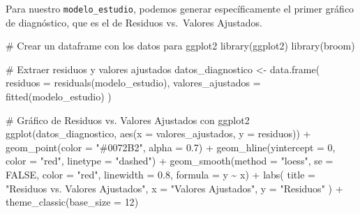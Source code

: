 \documentclass[
  letterpaper,
  DIV=11,
  numbers=noendperiod]{scrreprt}
\newenvironment{Shaded}{\begin{snugshade}}{\end{snugshade}}
\newcommand{\AttributeTok}[1]{\textcolor[rgb]{0.40,0.45,0.13}{#1}}
\newcommand{\CommentTok}[1]{\textcolor[rgb]{0.37,0.37,0.37}{#1}}
\newcommand{\ConstantTok}[1]{\textcolor[rgb]{0.56,0.35,0.01}{#1}}
\newcommand{\DecValTok}[1]{\textcolor[rgb]{0.68,0.00,0.00}{#1}}
\newcommand{\FloatTok}[1]{\textcolor[rgb]{0.68,0.00,0.00}{#1}}
\newcommand{\FunctionTok}[1]{\textcolor[rgb]{0.28,0.35,0.67}{#1}}
\newcommand{\NormalTok}[1]{\textcolor[rgb]{0.00,0.23,0.31}{#1}}
\newcommand{\OtherTok}[1]{\textcolor[rgb]{0.00,0.23,0.31}{#1}}
\newcommand{\SpecialCharTok}[1]{\textcolor[rgb]{0.37,0.37,0.37}{#1}}
\newcommand{\StringTok}[1]{\textcolor[rgb]{0.13,0.47,0.30}{#1}}
\begin{document}
\begin{tcolorbox}[enhanced jigsaw, breakable, toprule=.15mm, bottomtitle=1mm, coltitle=black, colbacktitle=quarto-callout-tip-color!10!white, titlerule=0mm, opacitybacktitle=0.6, bottomrule=.15mm, toptitle=1mm, title=\textcolor{quarto-callout-tip-color}{\faLightbulb}\hspace{0.5em}{Ejemplo de un modelo válido}, arc=.35mm, rightrule=.15mm, opacityback=0, colframe=quarto-callout-tip-color-frame, leftrule=.75mm, left=2mm, colback=white]

Para nuestro \texttt{modelo\_estudio}, podemos generar específicamente
el primer gráfico de diagnóstico, que es el de Residuos vs.~Valores
Ajustados.

\begin{Shaded}
\begin{Highlighting}[]
\CommentTok{\# Crear un dataframe con los datos para ggplot2}
\FunctionTok{library}\NormalTok{(ggplot2)}
\FunctionTok{library}\NormalTok{(broom)}

\CommentTok{\# Extraer residuos y valores ajustados}
\NormalTok{datos\_diagnostico }\OtherTok{\textless{}{-}} \FunctionTok{data.frame}\NormalTok{(}
  \AttributeTok{residuos =} \FunctionTok{residuals}\NormalTok{(modelo\_estudio),}
  \AttributeTok{valores\_ajustados =} \FunctionTok{fitted}\NormalTok{(modelo\_estudio)}
\NormalTok{)}

\CommentTok{\# Gráfico de Residuos vs. Valores Ajustados con ggplot2}
\FunctionTok{ggplot}\NormalTok{(datos\_diagnostico, }\FunctionTok{aes}\NormalTok{(}\AttributeTok{x =}\NormalTok{ valores\_ajustados, }\AttributeTok{y =}\NormalTok{ residuos)) }\SpecialCharTok{+}
  \FunctionTok{geom\_point}\NormalTok{(}\AttributeTok{color =} \StringTok{"\#0072B2"}\NormalTok{, }\AttributeTok{alpha =} \FloatTok{0.7}\NormalTok{) }\SpecialCharTok{+}
  \FunctionTok{geom\_hline}\NormalTok{(}\AttributeTok{yintercept =} \DecValTok{0}\NormalTok{, }\AttributeTok{color =} \StringTok{"red"}\NormalTok{, }\AttributeTok{linetype =} \StringTok{"dashed"}\NormalTok{) }\SpecialCharTok{+}
  \FunctionTok{geom\_smooth}\NormalTok{(}\AttributeTok{method =} \StringTok{"loess"}\NormalTok{, }\AttributeTok{se =} \ConstantTok{FALSE}\NormalTok{, }\AttributeTok{color =} \StringTok{"red"}\NormalTok{, }\AttributeTok{linewidth =} \FloatTok{0.8}\NormalTok{, }\AttributeTok{formula =}\NormalTok{ y }\SpecialCharTok{\textasciitilde{}}\NormalTok{ x) }\SpecialCharTok{+}
  \FunctionTok{labs}\NormalTok{(}
    \AttributeTok{title =} \StringTok{"Residuos vs. Valores Ajustados"}\NormalTok{,}
    \AttributeTok{x =} \StringTok{"Valores Ajustados"}\NormalTok{,}
    \AttributeTok{y =} \StringTok{"Residuos"}
\NormalTok{  ) }\SpecialCharTok{+}
  \FunctionTok{theme\_classic}\NormalTok{(}\AttributeTok{base\_size =} \DecValTok{12}\NormalTok{)}
\end{Highlighting}
\end{Shaded}


\end{tcolorbox}
\end{document}
